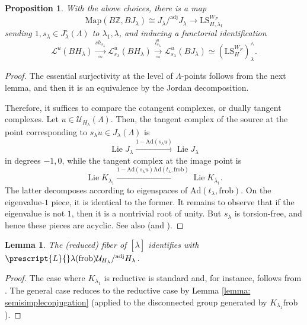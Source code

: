 \documentclass{amsart}
\newtheorem{lemma}[theorem]{Lemma}
\newtheorem{proposition}[theorem]{Proposition}
\theoremstyle{definition}
\theoremstyle{remark}
\numberwithin{equation}{section}
\DeclareMathOperator{\Lie}{Lie}
\newcommand{\mc}{\mathcal}
\newcommand{\Z}{\mathbb{Z}}
\newcommand{\co}[1]{\prescript{#1}{}}
\newcommand{\frob}{\mathrm{frob}}
\newcommand{\Ad}{\mathrm{Ad}}
\newcommand{\Map}{\mathrm{Map}}
\newcommand{\LS}{\mathrm{LS}}
\newcommand{\adj}{\mathrm{adj}}
\begin{document}
\begin{proposition}\label{prop: ReductionToUnipotentWeilParameters}
With the above choices, there is a map
\[
\Map (B\Z, BJ_\lambda)\cong J_\lambda /^\adj J_\lambda \to \LS_{H, \lambda_I}^{W_F} 
\]
sending $1, s_\lambda\in J_\lambda^\circ (\Lambda)$ to $\lambda_1, \lambda$, and inducing a functorial identification
\[
\mc L^u (B H_\lambda)
\xrightarrow[\simeq]{sh_{s_\lambda}}
\mc L^u_{s_\lambda}(BH_\lambda)
\xrightarrow[\simeq]{l^u_{s_\lambda}}
\mc L^u_{s_\lambda}(BJ_\lambda)
\simeq
(\LS_{H}^{W_F})^{\wedge}_\lambda. 
\]
\end{proposition}

\begin{proof}
The essential surjectivity at the level of $\Lambda$-points follows from the next lemma, and then it is an equivalence by the Jordan decomposition. 

Therefore, it suffices to compare the cotangent complexes, or dually tangent complexes. Let $u\in \mc U_{H_\lambda}(\Lambda)$. Then, the tangent complex of the source at the point corresponding to $s_\lambda u \in J_\lambda (\Lambda)$ is
\[
\Lie J_\lambda \xrightarrow{1 - \Ad(s_\lambda u)} \Lie J_\lambda
\]
in degrees $-1, 0$, while the tangent complex at the image point is 
\[
\Lie K_{\lambda_1} \xrightarrow{1 - \Ad(s_\lambda u)\Ad (t_\lambda, \frob)} \Lie K_{\lambda_1}. 
\]
The latter decomposes according to eigenspaces of $\Ad (t_\lambda, \frob)$. On the eigenvalue-$1$ piece, it is identical to the former. It remains to observe that if the eigenvalue is not $1$, then it is a nontrivial root of unity. But $s_\lambda$ is torsion-free, and hence these pieces are acyclic. See also \cite[Propositions 2.16, 2.17]{YangZhu} (and \cite[Lemma 2.9, Proposition 2.44]{ZhuTame}). 
\end{proof}

\begin{lemma}\label{lem: FibersOfGITQuotientMap}
The (reduced) fiber of $[\overline{\lambda}]$ identifies with $\co{L}\lambda(\frob)\mc U_{H_\lambda}/^\adj H_\lambda$.
\end{lemma}

\begin{proof}
The case where $K_{\lambda_1}$ is reductive is standard and, for instance, follows from \cite[Proposition 3.18]{Mohrdieck}. The general case reduces to the reductive case by Lemma \ref{lemma: semisimpleconjugation} (applied to the disconnected group generated by $K_{\lambda_1}\frob$). 
\end{proof}
\end{document}
